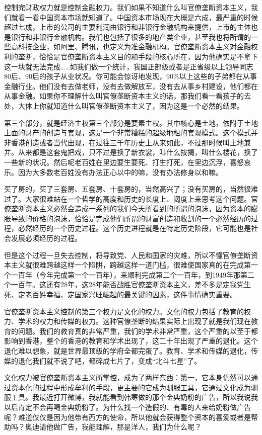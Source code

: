 \documentclass[UTF8, 12pt, a4paper]{ctexrep}
\begin{document}
控制完财政权力就是控制金融权力。我们如果不知道什么叫官僚垄断资本主义，我们就看一看中国资本市场就知道了。中国资本市场现在大概是六成，最严重的时候超过七成，上市的公司的主要利润由银行和非银行金融机构来提供，上市的主体也是银行和非银行金融机构。我们也包括了很多的地产类企业，甚至我也将所谓的一些高科技企业，如阿里、腾讯，也定义为准金融机构。官僚垄断资本主义对金融权利的垄断，恰恰是官僚垄断资本主义目的和手段的核心所在，因为他确实是不拿下这一块就无法完成……如我们做一个统计，我国正部级或者是正省级以上领导同志80后、90后的孩子从业状况。你可能会惊讶地发现，90\%以上这些的子弟都在从事金融行业。他们没有去做老师，没有去做解放军，没有去从事乡村建设，他们都在从事金融。如果你不理解什么叫官僚垄断资本主义的话，那我们看一看孩子的去处，大体上你就知道什么叫官僚垄断资本主义了，因为这是一个必然的结果。

第三个部分，就是经济主权第三个部分是要素主权。其中核心是土地，依附于土地上面的财产的创造与套现，这是一个非常糟糕的超级地租的套现模式。这个模式并非香港创造或者当代出现，在过往三千年历史上从来如此，不过那时候叫土地兼并。从来都是这套鬼把戏，只不过是换了新衣裳，叫什么按揭，叫什么楼花，换了一些新的状况。然后呢老百姓在里边要生要死、打生打死，在里边沉浮，喜怒哀乐。因为大多数老百姓没有办法正心以中的嘛，没有办法修身以和嘛。

买了房的，买了三套房、五套房、十套房的，当然高兴了；没有买房的，当然很难过了。大家很难站在一个哲学的高度和历史的长度上、阔度上来思考这个问题。官僚垄断资本主义必然会造成一系列的我们今天所看到的所谓的泡沫，因为资本的膨胀导致的价格的泡沫，恰恰是完成他们所谓的财富创造和收割的一个必然经历的过程，必然经历的一个历史过程。这个历史进程就是在特定历史阶段，它可能也是社会发展必须经历的过程。

但是这个过程一旦失去控制，将导致党、人民和国家的灾难，所以不懂官僚垄断资本主义就很难跨越这样一个陷阱，跨越这样一道门槛，很难使国家真的在完成第一个一百年（今年完成第一个一百年），来顺利完成第二个一百年，到1949年那第二个一百年。这还有28年，这28年能否战胜官僚垄断资本主义，差不多是定我党生死、定老百姓幸福、定国家兴旺崛起的最关键的因素，这件事情确实重要。

官僚垄断资本主义控制的第三个权力是文化的权力。文化的权力包括了教育的权力、学术的权力和传媒的权力。这种官僚垄断的结果实际上出现了就是我们现在教育的问题。我们的教育真的非常严重，我们的学术非常严重，这个严重的以至于都影响到香港，整个的香港的教育和学术出现了，这二十年出现了严重的退化。这个退化难以想象，就是世界最顶级的学府全都完蛋了。教育、学术和传媒的退化，传媒的退化我们就不说了吧，都碎成七片了，变成“北斗七星”了。

文化权力被官僚垄断资本主义所掌控，成为了两样东西：第一，它本身仍然可以通过资本化的过程中形成牟利的手段，更主要的它成为驯服工具，它通过文化成为驯服工具。我最近打开微博，我就能看到韩寒做的那个金典奶粉的广告，所以我说我以后肯定不会再喝金典奶粉了。为什么找一个造假的、有毒的人来给奶粉做广告呢？难道仅仅是因为他带有西方的使命，所以他就会获得整个资本的喜爱或者是帮助吗？奥迪请他做广告，我能理解，那是洋人，我们为什么呢？
\end{document}
